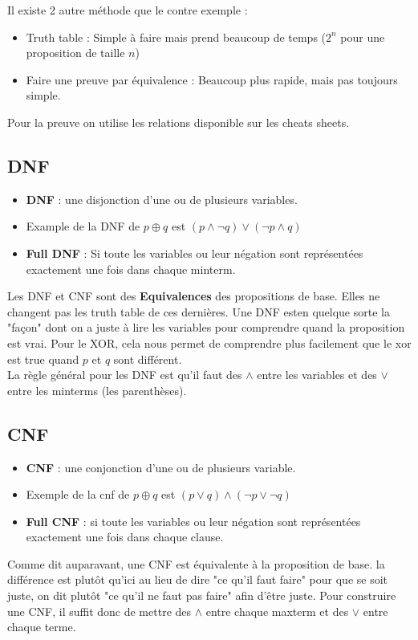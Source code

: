 Il existe 2 autre méthode que le contre exemple :
\begin{itemize}
    \item Truth table : Simple à faire mais prend beaucoup de temps ($2^n$ pour une proposition de taille $n$)
    \item Faire une preuve par équivalence : Beaucoup plus rapide, mais pas toujours simple. 
\end{itemize}
Pour la preuve on utilise les relations disponible sur les cheats sheets.



\subsection{DNF}
\begin{itemize}
    \item \textbf{DNF} : une disjonction d'une ou de plusieurs variables.
    \item Example de la DNF de $p \oplus q$ est $(p \wedge \neg q) \vee (\neg p\wedge q)$
    \item \textbf{Full DNF} : Si toute les variables ou leur négation sont représentées exactement une fois dans chaque minterm.
\end{itemize}
Les DNF et CNF sont des \textbf{Equivalences} des propositions de base. Elles ne changent pas les truth table de ces dernières. Une DNF esten quelque sorte la "façon" dont on a juste à lire les variables pour comprendre quand la proposition est vrai. Pour le XOR, cela nous permet de comprendre plus facilement que le xor est true quand $p$ et $q$ sont différent. 
\\
La règle général pour les DNF est qu'il faut des $\wedge$ entre les variables et des $\vee$ entre les minterms (les parenthèses).

\subsection{CNF}
\begin{itemize}
    \item \textbf{CNF} : une conjonction d'une ou de plusieurs variable.
    \item Exemple de la cnf de $p\oplus q$ est $(p\vee q) \wedge (\neg p \vee \neg q)$
    \item \textbf{Full CNF} : si toute les variables ou leur négation sont représentées exactement une fois dans chaque clause.
\end{itemize}
Comme dit auparavant, une CNF est équivalente à la proposition de base. la différence est plutôt qu'ici au lieu de dire "ce qu'il faut faire" pour que se soit juste, on dit plutôt "ce qu'il ne faut pas faire" afin d'être juste. Pour construire une CNF, il suffit donc de mettre des $\wedge$ entre chaque maxterm et des $\vee$ entre chaque terme.

